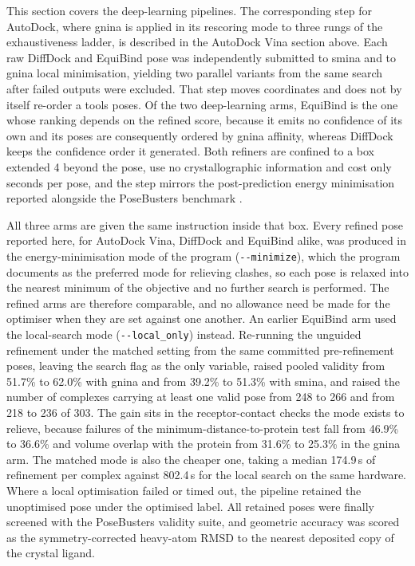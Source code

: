 This section covers the deep-learning pipelines. The corresponding step for AutoDock, where gnina is applied in its rescoring mode to three rungs of the exhaustiveness ladder, is described in the AutoDock Vina section above. Each raw DiffDock and EquiBind pose was independently submitted to smina and to gnina local minimisation, yielding two parallel variants from the same search after failed outputs were excluded. That step moves coordinates and does not by itself re-order a tool\textquotesingle s poses. Of the two deep-learning arms, EquiBind is the one whose ranking depends on the refined score, because it emits no confidence of its own and its poses are consequently ordered by gnina affinity, whereas DiffDock keeps the confidence order it generated. Both refiners are confined to a box extended 4\angstrom{} beyond the pose, use no crystallographic information and cost only seconds per pose, and the step mirrors the post-prediction energy minimisation reported alongside the PoseBusters benchmark \cite{ref035}.

All three arms are given the same instruction inside that box. Every refined pose reported here, for AutoDock Vina, DiffDock and EquiBind alike, was produced in the energy-minimisation mode of the program (\texttt{-{}-minimize}), which the program documents as the preferred mode for relieving clashes, so each pose is relaxed into the nearest minimum of the objective and no further search is performed. The refined arms are therefore comparable, and no allowance need be made for the optimiser when they are set against one another. An earlier EquiBind arm used the local-search mode (\texttt{-{}-local\_only}) instead. Re-running the unguided refinement under the matched setting from the same committed pre-refinement poses, leaving the search flag as the only variable, raised pooled validity from 51.7\% to 62.0\% with gnina and from 39.2\% to 51.3\% with smina, and raised the number of complexes carrying at least one valid pose from 248 to 266 and from 218 to 236 of 303. The gain sits in the receptor-contact checks the mode exists to relieve, because failures of the minimum-distance-to-protein test fall from 46.9\% to 36.6\% and volume overlap with the protein from 31.6\% to 25.3\% in the gnina arm. The matched mode is also the cheaper one, taking a median 174.9\,s of refinement per complex against 802.4\,s for the local search on the same hardware. Where a local optimisation failed or timed out, the pipeline retained the unoptimised pose under the optimised label. All retained poses were finally screened with the PoseBusters validity suite, and geometric accuracy was scored as the symmetry-corrected heavy-atom RMSD to the nearest deposited copy of the crystal ligand.

